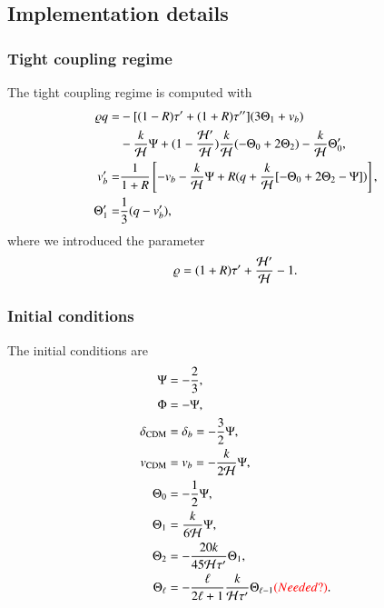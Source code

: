 \subsection{Implementation details}\label{ssec:M3:implementations} 

\subsubsection{Tight coupling regime} \label{sssec:M3:implementations:tight_coupling_regime}
The tight coupling regime is computed with 
\begin{subequations} \label{eq:M3:implementations:TC_ODEs}
    \begin{align}
        \varrho q =& -[(1-R)\tau' + (1+R)\tau''](3\Theta_1 + v_b) \nonumber \\
            & -\frac{k}{\mathcal{H}}\Psi + (1-\frac{\mathcal{H}'}{\mathcal{H}})\frac{k}{\mathcal{H}}(-\Theta_0 + 2\Theta_2) - \frac{k}{\mathcal{H}}\Theta_0', \label{eq:M3:implementations:TC_ODEs_q} \\
        v_b' =& \frac{1}{1+R}\left[ -v_b-\frac{k}{\mathcal{H}}\Psi + R(q+\frac{k}{\mathcal{H}}[-\Theta_0+2\Theta_2-\Psi]) \right], \label{eq:M3:implementations:TC_ODEs_v_b} \\
        \Theta_1' =& \frac{1}{3}(q-v_b'), \label{eq:M3:implementations:TC_ODEs_Theta_1} 
    \end{align}
\end{subequations}
where we introduced the parameter 
\begin{equation} \label{eq:M3:implementations:q_prefactor}
    \varrho = (1+R)\tau' + \frac{\mathcal{H}'}{\mathcal{H}} - 1.
\end{equation}


\subsubsection{Initial conditions} \label{sssec:M3:implementations:initial_conditions}
The initial conditions are 
\begin{subequations} \label{eq:M3:implementations:pert_ODE_IC}
    \begin{align}
        \Psi &= -\frac{2}{3}, \label{eq:M3:implementations:pert_ODE_IC_Psi} \\
        \Phi &= - \Psi, \label{eq:M3:implementations:pert_ODE_IC_Phi} \\
        \delta_\mathrm{CDM} &= \delta_b = -\frac{3}{2}\Psi, \label{eq:M3:implementations:pert_ODE_IC_delta_cdm} \\
        v_\mathrm{CDM} &= v_b = -\frac{k}{2\mathcal{H}} \Psi, \label{eq:M3:implementations:pert_ODE_IC_v_cdm} \\
        \Theta_0 &= -\frac{1}{2}\Psi, \label{eq:M3:implementations:pert_ODE_IC_Theta0} \\
        \Theta_1 &= \frac{k}{6\mathcal{H}}\Psi, \label{eq:M3:implementations:pert_ODE_IC_Theta1} \\
        \Theta_2 &= - \frac{20k}{45\mathcal{H}\tau'}\Theta_1, \label{eq:M3:implementations:pert_ODE_IC_Theta2} \\
        \Theta_\ell &= - \frac{\ell}{2\ell+1} \frac{k}{\mathcal{H}\tau'}\Theta_{\ell-1} \textcolor{red}{(Needed?)}. \label{eq:M3:implementations:pert_ODE_IC_Theta_ell} 
    \end{align}
\end{subequations}

